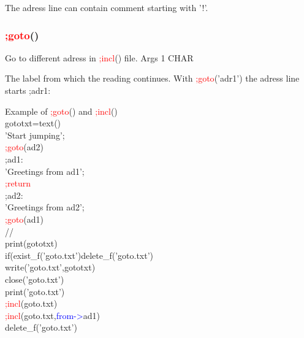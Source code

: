 \begin{note}
The adress line can contain comment starting with '!'.
\end{note}
\subsubsection{\textcolor{Red}{;goto}()}
\label{inpugoto}
Go to different adress in \textcolor{Red}{;incl}() file.
\vspace{0.3cm}
\hline
\vspace{0.3cm}
\noindent Args \tabto{3cm} 1 \tabto{5cm}  CHAR \tabto{7cm}
\begin{changemargin}{3cm}{0cm}
\noindent  The label from which the reading continues. With \textcolor{Red}{;goto}('adr1')
the adress line starts ;adr1:
\end {changemargin}
\hline
\vspace{0.2cm}
\begin{example}[inpugotoex]Example of \textcolor{Red}{;goto}() and \textcolor{Red}{;incl}()\\
\label{inpugotoex}
gototxt=\textcolor{VioletRed}{text}()\\
'Start jumping';\\
\textcolor{Red}{;goto}(ad2)\\
;ad1:\\
'Greetings from ad1';\\
\textcolor{Red}{;return}\\
;ad2:\\
'Greetings from ad2';\\
\textcolor{Red}{;goto}(ad1)\\
//\\
\textcolor{VioletRed}{print}(gototxt)\\
\textcolor{VioletRed}{if}(exist\_f('goto.txt')delete\_f('goto.txt')\\
\textcolor{VioletRed}{write}('goto.txt',gototxt)\\
\textcolor{VioletRed}{close}('goto.txt')\\
\textcolor{VioletRed}{print}('goto.txt')\\
\textcolor{Red}{;incl}(goto.txt)\\
\textcolor{Red}{;incl}(goto.txt,\textcolor{blue}{from->}ad1)\\
delete\_f('goto.txt')
\end{example}
